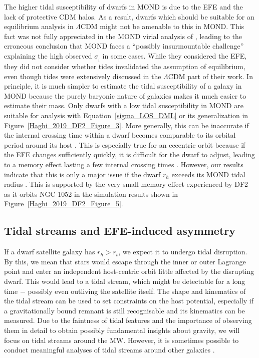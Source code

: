 \documentclass[fleqn,usenatbib,useAMS,onecolumn]{mnras} %
\begin{document}
The higher tidal susceptibility of dwarfs in MOND is due to the EFE and the lack of protective CDM halos. As a result, dwarfs which should be suitable for an equilibrium analysis in $\Lambda$CDM might not be amenable to this in MOND. This fact was not fully appreciated in the MOND virial analysis of \citet{Fattahi_2018}, leading to the erroneous conclusion that MOND faces a ``possibly insurmountable challenge'' explaining the high observed $\sigma_{_i}$ in some cases. While they considered the EFE, they did not consider whether tides invalidated the assumption of equilibrium, even though tides were extensively discussed in the $\Lambda$CDM part of their work. In principle, it is much simpler to estimate the tidal susceptibility of a galaxy in MOND because the purely baryonic nature of galaxies makes it much easier to estimate their mass. Only dwarfs with a low tidal susceptibility in MOND are suitable for analysis with Equation~\ref{sigma_LOS_DML} or its generalization in Figure~\ref{Haghi_2019_DF2_Figure_3}. More generally, this can be inaccurate if the internal crossing time within a dwarf becomes comparable to its orbital period around its host \citep{Brada_2000_tides, McGaugh_Wolf_2010}. This is especially true for an eccentric orbit because if the EFE changes sufficiently quickly, it is difficult for the dwarf to adjust, leading to a memory effect lasting a few internal crossing times \citep{Wu_2013}. However, our results indicate that this is only a major issue if the dwarf $r_h$ exceeds its MOND tidal radius \citep{Zhao_2005, Zhao_2006}. This is supported by the very small memory effect experienced by DF2 as it orbits NGC 1052 in the simulation results shown in Figure~\ref{Haghi_2019_DF2_Figure_5}.



\subsection{Tidal streams and EFE-induced asymmetry}
\label{Tidal_streams}

If a dwarf satellite galaxy has $r_h > r_t$, we expect it to undergo tidal disruption. By this, we mean that stars would escape through the inner or outer Lagrange point and enter an independent host-centric orbit little affected by the disrupting dwarf. This would lead to a tidal stream, which might be detectable for a long time $-$ possibly even outliving the satellite itself. The shape and kinematics of the tidal stream can be used to set constraints on the host potential, especially if a gravitationally bound remnant is still recognisable and its kinematics can be measured. Due to the faintness of tidal features and the importance of observing them in detail to obtain possibly fundamental insights about gravity, we will focus on tidal streams around the MW. However, it is sometimes possible to conduct meaningful analyses of tidal streams around other galaxies \citep[e.g. around M31;][]{Fardal_2013}.
\end{document}
